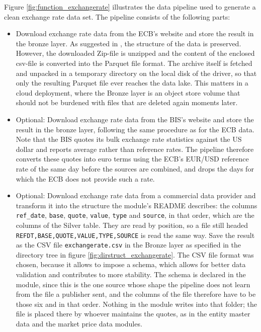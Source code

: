 Figure \ref{fig:function_exchangerate} illustrates the data pipeline used to generate a clean exchange rate data set. The pipeline consists of the following parts:
%
\begin{itemize}
	\item Download exchange rate data from the ECB's website and store the result in the bronze layer. As suggested in \textcite{Strengholt.2025}, the structure of the data is preserved. However, the downloaded Zip-file is unzipped and the content of the enclosed csv-file is converted into the Parquet file format. The archive itself is fetched and unpacked in a temporary directory on the local disk of the driver, so that only the resulting Parquet file ever reaches the data lake. This matters in a cloud deployment, where the Bronze layer is an object store volume that should not be burdened with files that are deleted again moments later.
	\item Optional: Download exchange rate data from the BIS's website and store the result in the bronze layer, following the same procedure as for the ECB data. Note that the BIS quotes its bulk exchange rate statistics against the US dollar and reports average rather than reference rates. The pipeline therefore converts these quotes into euro terms using the ECB's EUR/USD reference rate of the same day before the sources are combined, and drops the days for which the ECB does not provide such a rate.
	\item Optional: Download exchange rate data from a commercial data provider and transform it into the structure the module's README describes: the columns \verb|ref_date|, \verb|base|, \verb|quote|, \verb|value|, \verb|type| and \verb|source|, in that order, which are the columns of the Silver table. They are read by position, so a file still headed \verb|REFDT,BASE,QUOTE,VALUE,TYPE,SOURCE| is read the same way. Save the result as the CSV file \verb|exchangerate.csv| in the Bronze layer as specified in the directory tree in figure \ref{fig:dirstruct_exchangerate}. The CSV file format was chosen, because it allows to impose a schema, which allows for better data validation and contributes to more stability. The schema is declared in the module, since this is the one source whose shape the pipeline does not learn from the file a publisher sent, and the columns of the file therefore have to be those six and in that order. Nothing in the module writes into that folder; the file is placed there by whoever maintains the quotes, as in the entity master data and the market price data modules.


\end{itemize}
